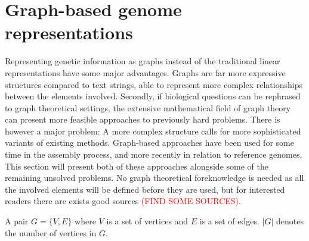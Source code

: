 \documentclass[thesis.tex]{subfiles}
\begin{document}
\section{Graph-based genome representations}
Representing genetic information as graphs instead of the traditional linear representations have some major advantages. Graphs are far more expressive structures compared to text strings, able to represent more complex relationships between the elements involved. Secondly, if biological questions can be rephrased to graph theoretical settings, the extensive mathematical field of graph theory can present more feasible approaches to previously hard problems. There is however a major problem: A more complex structure calls for more sophisticated variants of existing methods. Graph-based approaches have been used for some time in the assembly process, and more recently in relation to reference genomes. This section will present both of these approaches alongside some of the remaining unsolved problems. No graph theoretical foreknowledge is needed as all the involved elements will be defined before they are used, but for interested readers there are exists good sources \textcolor{red}{(FIND SOME SOURCES)}.
\begin{defn}[Graph]
  A pair $G=\{V,E\}$ where $V$ is a set of vertices and $E$ is a set of edges. $|G|$ denotes the number of vertices in $G$.
\end{defn}
\end{document}
